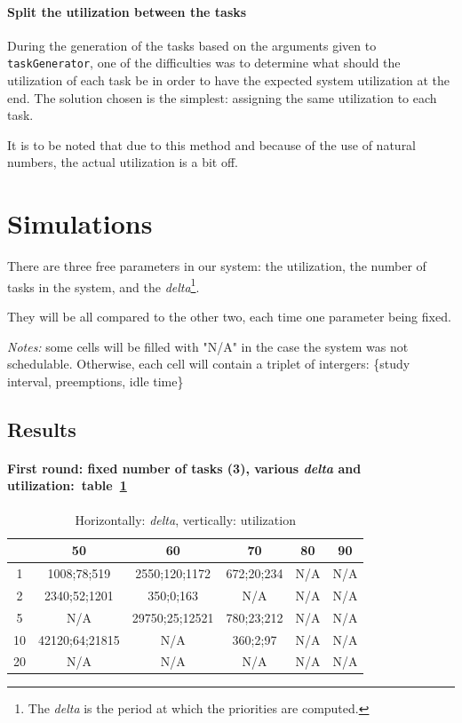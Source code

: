 \documentclass[a4paper,11pt]{article}
\begin{document}
    \paragraph{Split the utilization between the tasks} During the generation of the tasks based on the arguments given to \texttt{taskGenerator}, one of the difficulties was to determine what should the utilization of each task be
    in order to have the expected system utilization at the end.
    The solution chosen is the simplest: assigning the same utilization to each task.
     
    It is to be noted that due to this method and because of the use of natural numbers, the actual utilization is a bit off.
     
    \section{Simulations}\label{sec:anal}
    There are three free parameters in our system: the utilization, the number of tasks in the system, and the \textit{delta}\footnote{The \textit{delta} is the period at which the priorities are computed.}.
     
    They will be all compared to the other two, each time one parameter being fixed.
     
    \textit{Notes:} some cells will be filled with "N/A" in the case the system was not schedulable. Otherwise, each cell will contain a triplet of intergers: \{study interval, preemptions, idle time\}
     
	\subsection{Results}
    \paragraph{First round: fixed number of tasks (3), various
	\textit{delta} and utilization:~table~\ref{tb:test1}}
    \begin{table}[!h]
    \centering
    \begin{tabular}{|c|c|c|c|c|c|} \hline
       & 50 & 60 & 70 & 80 & 90 \\ \hline
			1&1008;78;519&2550;120;1172&672;20;234&N/A&N/A\\ \hline
		2&2340;52;1201&350;0;163&N/A&N/A&N/A \\ \hline
		5&N/A&29750;25;12521&780;23;212&N/A&N/A\\ \hline
		10&42120;64;21815&N/A&360;2;97&N/A&N/A \\ \hline
		20&N/A&N/A&N/A&N/A&N/A \\ \hline
   \end{tabular}
    \caption{Horizontally: \textit{delta}, vertically: utilization}
	\label{tb:test1}
    \end{table}
     
\end{document}
